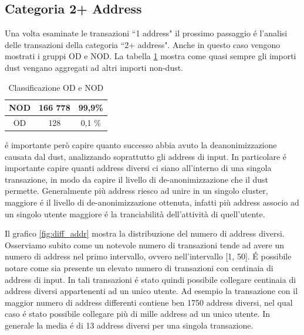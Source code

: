 \subsection{Categoria 2+ Address}
Una volta esaminate le transazioni ``1 address" il prossimo passaggio é l'analisi delle transazioni della categoria ``2+ address". Anche in questo caso vengono mostrati i gruppi OD e NOD. La tabella \ref{tab:OD_NOD_success} mostra come quasi sempre gli importi dust vengano aggregati ad altri importi non-dust.
\begin{table}[H]
    \centering
    \begin{tabular}{|c|c|c|}
        \hline
            NOD  & 166 778 & 99,9\%\\
        \hline 
            OD  & 128 & 0,1 \%\\
        \hline
    \end{tabular}
    \caption{Classificazione OD e NOD}
    \label{tab:OD_NOD_success}
\end{table}
é importante però capire quanto successo abbia avuto la deanonimizzazione causata dal dust, analizzando soprattutto gli address di input. In particolare é importante capire quanti address diversi ci siano all'interno di una singola transazione, in modo da capire il livello di de-anonimizzazione che il dust permette. Generalmente più address riesco ad unire in un singolo cluster, maggiore é il livello di de-anonimizzazione ottenuta, infatti più address associo ad un singolo utente maggiore é la tranciabilità dell'attività di quell'utente.

Il grafico \ref{fig:diff_addr} mostra la distribuzione del numero di address diversi. Osserviamo subito come un notevole numero di transazioni tende ad avere un numero di address nel primo intervallo, ovvero nell'intervallo [1, 50]. É possibile notare come sia presente un elevato numero di transazioni con centinaia di address di input. In tali transazioni é stato quindi possibile collegare centinaia di address diversi appartenenti ad un unico utente. Ad esempio la transazione con il maggior numero di address differenti contiene ben 1750 address diversi, nel qual caso é stato possibile collegare più di mille address ad un unico utente. In generale la media é di 13 address diversi per una singola transazione. 

